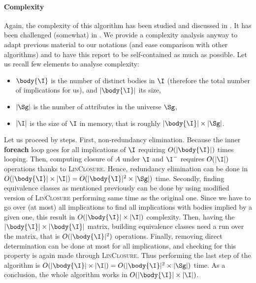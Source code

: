  
 
\vspace{1.2em}


\paragraph{Complexity} Again, the complexity of this algorithm has been studied
and discussed in \cite{david_minimum_1980, maier_theory_1983}. It has been 
challenged (somewhat) in \cite{ausiello_graph_1983, ausiello_minimal_1986}. We
provide a complexity analysis anyway to adapt previous material to our notations
(and ease comparison with other algorithms) and to have this report to be 
self-contained as much as possible. Let us recall few elements to analyse
complexity:
\begin{itemize}
	\item $\body{\I}$ is the number of distinct bodies in $\I$ (therefore the
	total number of implications for us), and $|\body{\I}|$ its size,
	\item $|\Sg|$ is the number of attributes in the universe $\Sg$,
	\item $|\I|$ is the size of $\I$ in memory, that is roughly $|\body{\I}| 
	\times |\Sg|$.
\end{itemize}
\noindent Let us proceed by steps. First, non-redundancy elimination. Because 
the inner \textbf{foreach} loop goes for all implications of $\I$ requiring 
$O(|\body{\I}|)$ times looping. Then, computing closure of $A$ under $\I$ and 
$\I^{-}$ requires $O(|\I|)$ operations thanks to \textsc{LinClosure}. Hence,
redundancy elimination can be done in $O(|\body{\I}| \times |\I|) = 
O(|\body{\I}|^2 \times |\Sg|)$ time. Secondly, finding equivalence classes as
mentioned previously can be done by using modified version of 
\textsc{LinClosure} performing same time as the original one. Since we have to
go over (at most) all implications to find all implications with bodies implied
by a given one, this result in $O(|\body{\I}| \times |\I|)$ complexity. Then,
having the $|\body{\I}| \times |\body{\I}|$ matrix, building equivalence classes
need a run over the matrix, that is $O(|\body{\I}|^2)$ operations. Finally,
removing direct determination can be done at most for all implications, and 
checking for this property is again made through \textsc{LinClosure}. Thus 
performing the last step of the algorithm is $O(|\body{\I}| \times |\I|) = 
O(|\body{\I}|^2 \times |\Sg|)$ time. As a conclusion, the whole algorithm works
in $O(|\body{\I}| \times |\I|)$.
